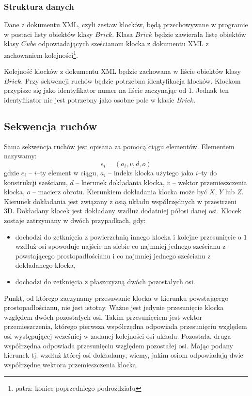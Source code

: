 \documentclass[12pt]{article}
\begin{document}
\subsubsection{Struktura danych}
Dane z dokumentu XML, czyli zestaw klocków, będą przechowywane w programie
w postaci listy obiektów klasy $Brick$. Klasa $Brick$ będzie zawierała
listę obiektów klasy $Cube$ odpowiadających sześcianom klocka z dokumentu
XML z zachowaniem kolejności\footnote{patrz: koniec poprzedniego
podrozdziału}.

Kolejność klocków z dokumentu XML będzie zachowana w liście obiektów klasy
$Brick$. Przy sekwencji ruchów będzie potrzebna identyfikacja klocków.
Klockom przypisze się jako identyfikator numer na liście zaczynając od $1$.
Jednak ten identyfikator nie jest potrzebny jako osobne pole w klasie
$Brick$.

\subsection{Sekwencja ruchów}
Sama sekwencja ruchów jest opisana za pomocą ciągu elementów. Elementem
nazywamy:
\begin{equation}
	e_i = (a_i,v,d,o)
\end{equation}
gdzie
$e_i$ -- $i$--ty element w ciągu,
$a_i$ -- indeks klocka użytego jako $i$--ty do konstrukcji sześcianu,
$d$ -- kierunek dokładania klocka,
$v$ -- wektor przemieszczenia klocka,
$o$ -- macierz obrotu.
Kierunkiem dokładania klocka może być $X$, $Y$ lub $Z$. Kierunek dokładania
jest związany z osią układu współrzędnych w przestrzeni 3D. Dokładany
klocek jest dokładany wzdłuż dodatniej półosi danej osi. Klocek zostaje
zatrzymany w dwóch przypadkach, gdy:
\begin{itemize}
	\item dochodzi do zetknięcia z powierzchnią innego klocka i kolejne
		przesunięcie o $1$ wzdłuż osi spowoduje najście na siebie co najmniej 
		jednego sześcianu z powstającego prostopadłościanu i co najmniej
		jednego sześcianu z dokładanego klocka,
	\item dochodzi do zetknięcia z płaszczyzną dwóch pozostałych osi.
\end{itemize}
Punkt, od którego zaczynamy przesuwanie klocka w kierunku powstającego
prostopadłościanu, nie jest istotny. Ważne jest jedynie przesunięcie
klocka względem dwóch pozostałych osi. Takim przesunięciem jest wektor
przemieszczenia, którego pierwsza współrzędna odpowiada przesunięciu
względem osi występującej wcześniej w zadanej kolejności osi układu.
Pozostała, druga współrzędna odpowiada przesunięciu względem pozostałej
osi. Mając podany kierunek tj. wzdłuż której osi dokładamy, wiemy,
jakim osiom odpowiadają dwie współrzędne wektora przemieszczenia klocka.
\end{document}
